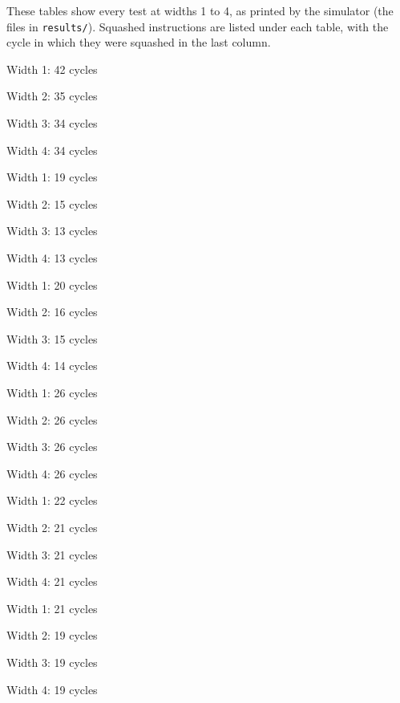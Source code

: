 \documentclass[11pt]{article}
\newcommand{\code}[1]{\texttt{#1}}
\newcommand{\cycletable}[1]{{\scriptsize\setlength{\tabcolsep}{2.5pt}}}
\newcommand{\widthtable}[3]{\begin{minipage}[t]{0.49\textwidth}\centering
  {\small Width #2: #3 cycles}\par\smallskip\cycletable{#1}\end{minipage}}
\begin{document}
These tables show every test at widths 1 to 4, as printed by the simulator (the files in
\code{results/}). Squashed instructions are listed under each table, with the cycle in which
they were squashed in the last column.

\begin{table}[htbp]
\centering
\caption{\code{original\_code\_in} at widths 1 to 4.}
\label{tab:orig}
\widthtable{original_code_in.w1}{1}{42}\hfill
\widthtable{original_code_in.w2}{2}{35}

\bigskip
\widthtable{original_code_in.w3}{3}{34}\hfill
\widthtable{original_code_in.w4}{4}{34}
\end{table}

\begin{table}[htbp]
\centering
\caption{\code{spec\_sample} at widths 1 to 4.}
\widthtable{spec_sample.w1}{1}{19}\hfill
\widthtable{spec_sample.w2}{2}{15}

\bigskip
\widthtable{spec_sample.w3}{3}{13}\hfill
\widthtable{spec_sample.w4}{4}{13}
\end{table}

\begin{table}[htbp]
\centering
\caption{\code{t1\_independent} at widths 1 to 4.}
\widthtable{t1_independent.w1}{1}{20}\hfill
\widthtable{t1_independent.w2}{2}{16}

\bigskip
\widthtable{t1_independent.w3}{3}{15}\hfill
\widthtable{t1_independent.w4}{4}{14}
\end{table}

\begin{table}[htbp]
\centering
\caption{\code{t2\_raw\_chain} at widths 1 to 4.}
\widthtable{t2_raw_chain.w1}{1}{26}\hfill
\widthtable{t2_raw_chain.w2}{2}{26}

\bigskip
\widthtable{t2_raw_chain.w3}{3}{26}\hfill
\widthtable{t2_raw_chain.w4}{4}{26}
\end{table}

\begin{table}[htbp]
\centering
\caption{\code{t3\_structural} at widths 1 to 4.}
\widthtable{t3_structural.w1}{1}{22}\hfill
\widthtable{t3_structural.w2}{2}{21}

\bigskip
\widthtable{t3_structural.w3}{3}{21}\hfill
\widthtable{t3_structural.w4}{4}{21}
\end{table}

\begin{table}[htbp]
\centering
\caption{\code{t4\_forwarding} at widths 1 to 4.}
\widthtable{t4_forwarding.w1}{1}{21}\hfill
\widthtable{t4_forwarding.w2}{2}{19}

\bigskip
\widthtable{t4_forwarding.w3}{3}{19}\hfill
\widthtable{t4_forwarding.w4}{4}{19}
\end{table}
\end{document}
